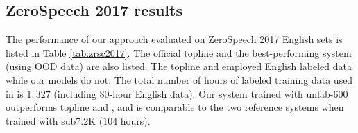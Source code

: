 \documentclass[a4paper]{article}
\begin{document}
\subsection{ZeroSpeech 2017 results}
\begin{table}[!t]
\renewcommand\arraystretch{0.80}
\centering
\caption{ABX error rate of  BNFs  on ZeroSpeech 2017 English sets. Models are trained with  Libri-light using Dutch labels.}
\label{tab:zrsc2017}
\end{table}
The performance of our approach evaluated on ZeroSpeech 2017 English sets is listed in Table \ref{tab:zrsc2017}. The official topline \cite{dunbar2017zero}  and the best-performing system (using OOD data) \cite{shibata2017composite} are also listed. The topline and \cite{shibata2017composite}  employed English labeled data while our models do not. The total number of hours of labeled training data used in \cite{shibata2017composite} is $1,327$ (including $80$-hour English data).
Our system trained with unlab-600 outperforms topline and \cite{shibata2017composite}, and is comparable to the two reference systems when trained with sub7.2K ($104$ hours).
\end{document}
